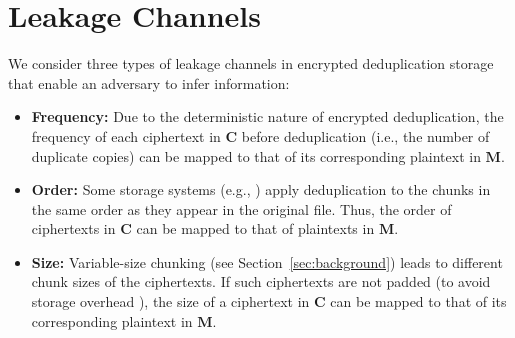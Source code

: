 \documentclass[bachelor]{thesis-uestc}
\begin{document}

\section{Leakage Channels}
\label{sec:leakage}

We consider three types of leakage channels in encrypted deduplication storage
that enable an adversary to infer information:
\begin{itemize}[leftmargin=*]
\item
{\bf Frequency:}  Due to the deterministic nature of encrypted deduplication,
the frequency of each ciphertext in $\mathbf{C}$ before deduplication (i.e., 
the number of duplicate copies) can be mapped to that of its corresponding
plaintext in $\mathbf{M}$. 
\item
{\bf Order:}  Some storage systems (e.g., \cite{xia11,lillibridge09,zhu08})
apply deduplication to the chunks in the same order as they appear in the
original file.  Thus, the order of ciphertexts in $\mathbf{C}$ can be mapped
to that of plaintexts in $\mathbf{M}$. 
\item
{\bf Size:}  Variable-size chunking (see Section~\ref{sec:background}) leads
to different chunk sizes of the ciphertexts.  If such ciphertexts are not
padded (to avoid storage overhead \cite{ritzdorf16}), the size of a ciphertext
in $\mathbf{C}$ can be mapped to that of its corresponding plaintext in
$\mathbf{M}$.    
\end{itemize}
\end{document}
